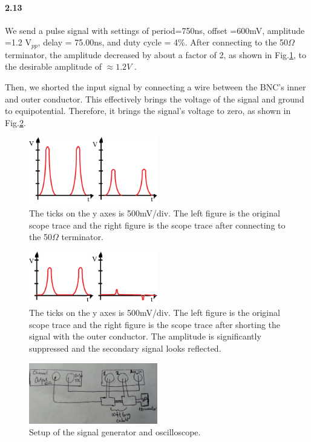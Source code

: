 \documentclass[authoryear, 12pt,5p, times]{elsarticle}
\begin{document}
\paragraph{\textbf{2.13}}
We send a pulse signal with settings of period=750ns, offset =600mV, amplitude =1.2 V$_{pp}$, delay = 75.00ns, and duty cycle = 4\%. After connecting to the 50$\Omega$ terminator, the amplitude decreased by about a factor of 2, as shown in Fig.\ref{terminator}, to the desirable amplitude of $\approx 1.2V$ . 
\par  Then, we shorted the input signal by connecting a wire between the BNC's inner and outer conductor.  This effectively brings the voltage of the signal and ground to equipotential. Therefore, it brings the signal's voltage to zero, as shown in Fig.\ref{short1}.
\begin{figure}[h!]
\includegraphics[width=0.5\textwidth]{figure/2_13_50ohmTerminator}
\caption{The ticks on the y axes is 500mV/div. The left figure is the original scope trace and the right figure is the scope trace after connecting to the 50$\Omega$ terminator.}
\label{terminator}
\end{figure}
\begin{figure}[h!]
\includegraphics[width=0.5\textwidth]{figure/2_13_short1}
\caption{The ticks on the y axes is 500mV/div. The left figure is the original scope trace and the right figure is the scope trace after shorting the signal with the outer conductor. The amplitude is significantly suppressed and the secondary signal looks reflected.}
\label{short1}
\end{figure}
\begin{figure}[h!]
\includegraphics[width=0.5\textwidth]{figure/10ftlongsetup}
\caption{Setup of the signal generator and oscilloscope.}
\label{10ftlongsetup}
\end{figure}
\end{document}
